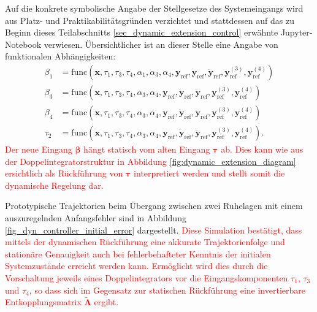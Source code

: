 Auf die konkrete symbolische Angabe der Stellgesetze des Systemeingangs wird aus Platz- und Praktikabilitätsgründen verzichtet und stattdessen auf das zu Beginn dieses Teilabschnitts \ref{sec_dynamic_extension_control} erwähnte Jupyter-Notebook verwiesen. Übersichtlicher ist an dieser Stelle eine Angabe von funktionalen Abhängigkeiten:
\begin{subequations}
	\begin{align}
		\beta_1 &= \mathrm{func}(\mathbf{x}, \tau_1, \tau_3, \tau_4, \alpha_1, \alpha_3, \alpha_4, \mathbf{y}_{\mathrm{ref}}, \dot{\mathbf{y}}_{\mathrm{ref}}, \ddot{\mathbf{y}}_{\mathrm{ref}}, \mathbf{y}_{\mathrm{ref}}^{(3)}, \mathbf{y}_{\mathrm{ref}}^{(4)}) \\
		\beta_3 &= \mathrm{func}(\mathbf{x}, \tau_1, \tau_3, \tau_4, \alpha_3, \alpha_4, \mathbf{y}_{\mathrm{ref}}, \dot{\mathbf{y}}_{\mathrm{ref}}, \ddot{\mathbf{y}}_{\mathrm{ref}}, \mathbf{y}_{\mathrm{ref}}^{(3)}, \mathbf{y}_{\mathrm{ref}}^{(4)}) \\
		\beta_4 &= \mathrm{func}(\mathbf{x}, \tau_1, \tau_3, \tau_4, \alpha_3, \alpha_4, \mathbf{y}_{\mathrm{ref}}, \dot{\mathbf{y}}_{\mathrm{ref}}, \ddot{\mathbf{y}}_{\mathrm{ref}}, \mathbf{y}_{\mathrm{ref}}^{(3)}, \mathbf{y}_{\mathrm{ref}}^{(4)}) \\
		\tau_2 &= \mathrm{func}(\mathbf{x}, \tau_1, \tau_3, \tau_4, \alpha_3, \alpha_4, \mathbf{y}_{\mathrm{ref}}, \dot{\mathbf{y}}_{\mathrm{ref}}, \ddot{\mathbf{y}}_{\mathrm{ref}}, \mathbf{y}_{\mathrm{ref}}^{(3)}, \mathbf{y}_{\mathrm{ref}}^{(4)}).
	\end{align}
\end{subequations}
\textcolor{red}{Der neue Eingang $\boldsymbol{\beta}$ hängt statisch vom alten Eingang $\boldsymbol{\tau}$ ab. Dies kann wie aus der Doppelintegratorstruktur in Abbildung \ref{fig:dynamic_extension_diagram} ersichtlich als Rückführung von $\boldsymbol{\tau}$ interpretiert werden und stellt somit die dynamische Regelung dar.}

Prototypische Trajektorien beim Übergang zwischen zwei Ruhelagen mit einem auszuregelnden Anfangsfehler sind in Abbildung \ref{fig_dyn_controller_initial_error} dargestellt. \textcolor{red}{Diese Simulation bestätigt, dass mittels der dynamischen Rückführung eine akkurate Trajektorienfolge und stationäre Genauigkeit auch bei fehlerbehafteter Kenntnis der initialen Systemzustände erreicht werden kann. Ermöglicht wird dies durch die Vorschaltung jeweils eines Doppelintegrators vor die Eingangskomponenten $\tau_{1}$, $\tau_{3}$ und $\tau_{4}$, so dass sich im Gegensatz zur statischen Rückführung eine invertierbare Entkopplungsmatrix $\tilde{\boldsymbol{\Lambda}}$ ergibt.}

